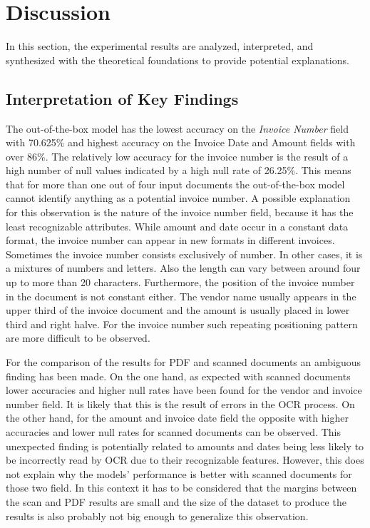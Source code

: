 \chapter{Discussion}

In this section, the experimental results are analyzed, interpreted, and synthesized with the theoretical foundations to provide potential explanations.

\section{Interpretation of Key Findings}
The out-of-the-box model has the lowest accuracy on the \textit{Invoice Number} field with 70.625\% and highest accuracy on the Invoice Date and Amount fields with over 86\%. 
The relatively low accuracy for the invoice number is the result of a high number of null values indicated by a high null rate of 26.25\%. 
This means that for more than one out of four input documents the out-of-the-box model cannot identify anything as a potential invoice number. 
A possible explanation for this observation is the nature of the invoice number field, because it has the least recognizable attributes. 
While amount and date occur in a constant data format, the invoice number can appear in new formats in different invoices. Sometimes the invoice number consists exclusively of number. 
In other cases, it is a mixtures of numbers and letters. Also the length can vary between around four up to more than 20 characters. 
Furthermore, the position of the invoice number in the document is not constant either. 
The vendor name usually appears in the upper third of the invoice document and the amount is usually placed in lower third and right halve.
For the invoice number such repeating positioning pattern are more difficult to be observed.

For the comparison of the results for PDF and scanned documents an ambiguous finding has been made. 
On the one hand, as expected with scanned documents lower accuracies and higher null rates have been found for the vendor and invoice number field. It is likely that this is the result of errors in the \ac{OCR} process.
On the other hand, for the amount and invoice date field the opposite with higher accuracies and lower null rates for scanned documents can be observed.
This unexpected finding is potentially related to amounts and dates being less likely to be incorrectly read by \ac{OCR} due to their recognizable features.
However, this does not explain why the models' performance is better with scanned documents for those two field. 
In this context it has to be considered that the margins between the scan and PDF results are small and the size of the dataset to produce the results is also probably not big enough to generalize this observation.

